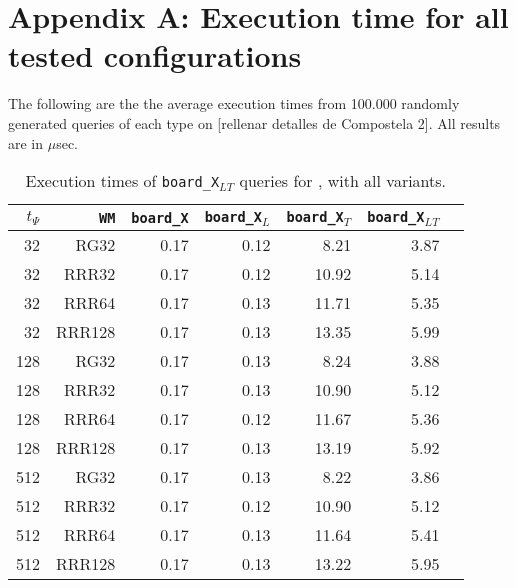 \appendix
\chapter*{Appendix A: Execution time for all tested configurations}
\label{app:times}
The following are the the average execution times from 100.000 randomly generated queries of each type on [rellenar detalles de Compostela 2]. All results are in $\mu$sec.


\begin{table}[hpt!]
\caption{Execution times of \texttt{board\_X$_{LT}$} queries for \ttctr, with all variants.}
\begin{tabular}{|r|r|r|r|r|r|r|}
\hline
$t_{\Psi}$ & \texttt{WM} & \texttt{board\_X} & \texttt{board\_X$_{L}$} & \texttt{board\_X$_{T}$} & \texttt{board\_X$_{LT}$} \\
\hline
32 & RG32 & 0.17 & 0.12 & 8.21 & 3.87 \\
32 & RRR32 & 0.17 & 0.12 & 10.92 & 5.14 \\
32 & RRR64 & 0.17 & 0.13 & 11.71 & 5.35 \\
32 & RRR128 & 0.17 & 0.13 & 13.35 & 5.99 \\
128 & RG32 & 0.17 & 0.13 & 8.24 & 3.88 \\
128 & RRR32 & 0.17 & 0.13 & 10.90 & 5.12 \\
128 & RRR64 & 0.17 & 0.12 & 11.67 & 5.36 \\
128 & RRR128 & 0.17 & 0.13 & 13.19 & 5.92 \\
512 & RG32 & 0.17 & 0.13 & 8.22 & 3.86 \\
512 & RRR32 & 0.17 & 0.12 & 10.90 & 5.12 \\
512 & RRR64 & 0.17 & 0.13 & 11.64 & 5.41 \\
512 & RRR128 & 0.17 & 0.13 & 13.22 & 5.95 \\
\hline
\end{tabular}
\end{table}

